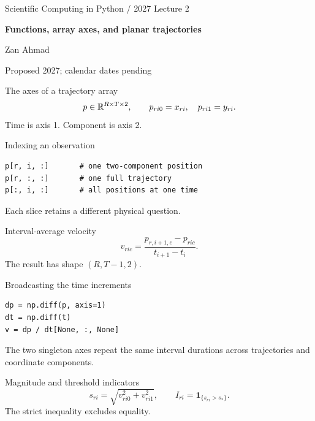 \documentclass[aspectratio=169,11pt]{beamer}
\newcommand{\notestarget}{notes.pdf}\newcommand{\noteslabel}{Notes}
\begin{document}
\begin{frame}[plain]\vfill
{\small\color{accent} Scientific Computing in Python / 2027 \quad Lecture 2}\par\medskip
{\raggedright{}\LARGE\bfseries\color{ink} Functions, array axes, and planar trajectories}\par\bigskip
Zan Ahmad\par\smallskip
{\small Proposed 2027; calendar dates pending}\par\vfill\end{frame}
\renewcommand{\notestarget}{notes.pdf\#note-the-axes-of-a-trajectory-array}
\begin{frame}[t,fragile,label=slide-the-axes-of-a-trajectory-array]{The axes of a trajectory array}
\[
p\in\mathbb{R}^{R\times T\times2},\qquad p_{ri0}=x_{ri},\quad p_{ri1}=y_{ri}.
\]
\pause{}
Time is axis 1. Component is axis 2.
\end{frame}
\renewcommand{\notestarget}{notes.pdf\#note-the-axes-of-a-trajectory-array}
\begin{frame}[t,fragile,label=slide-indexing-an-observation]{Indexing an observation}
\begin{verbatim}
p[r, i, :]       # one two-component position
p[r, :, :]       # one full trajectory
p[:, i, :]       # all positions at one time
\end{verbatim}
\pause{}
Each slice retains a different physical question.
\end{frame}
\renewcommand{\notestarget}{notes.pdf\#note-interval-average-velocity}
\begin{frame}[t,fragile,label=slide-interval-average-velocity]{Interval-average velocity}
\[
v_{ric}=\frac{p_{r,i+1,c}-p_{ric}}{t_{i+1}-t_i}.
\]
\pause{}
The result has shape $(R,T-1,2)$.
\end{frame}
\renewcommand{\notestarget}{notes.pdf\#note-interval-average-velocity}
\begin{frame}[t,fragile,label=slide-broadcasting-the-time-increments]{Broadcasting the time increments}
\begin{verbatim}
dp = np.diff(p, axis=1)
dt = np.diff(t)
v = dp / dt[None, :, None]
\end{verbatim}
\pause{}
The two singleton axes repeat the same interval durations across trajectories and coordinate components.
\end{frame}
\renewcommand{\notestarget}{notes.pdf\#note-magnitude-and-threshold-indicators}
\begin{frame}[t,fragile,label=slide-magnitude-and-threshold-indicators]{Magnitude and threshold indicators}
\[
s_{ri}=\sqrt{v_{ri0}^2+v_{ri1}^2},\qquad I_{ri}=\mathbf1_{\{s_{ri}>s_*\}}.
\]
\pause{}
The strict inequality excludes equality.
\end{frame}
\end{document}
